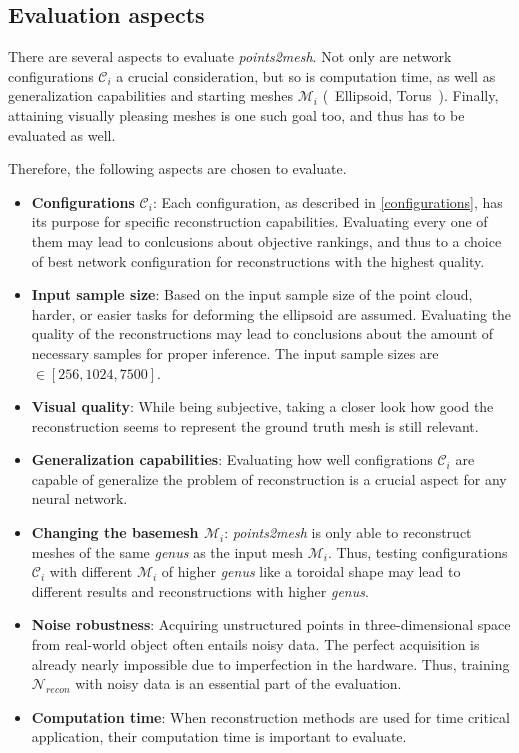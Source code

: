 \subsection{Evaluation aspects}
    There are several aspects to evaluate \emph{points2mesh}. Not only are network configurations $\mathcal{C}_i$ a crucial consideration,
    but so is computation time, as well as generalization capabilities and starting meshes $\mathcal{M}_i$ (~Ellipsoid, Torus~). 
    Finally,
    attaining visually pleasing meshes is one such goal too, and thus has to be evaluated as well.

    Therefore, the following aspects are chosen to evaluate.
    \begin{itemize}
        \item \textbf{Configurations} $\mathcal{C}_i$: Each configuration, as described in \ref{configurations}, has its purpose 
                for specific reconstruction capabilities. Evaluating every one of them may lead to conlcusions about objective rankings, and thus
                to a choice of best network configuration for reconstructions with the highest quality.
        \item \textbf{Input sample size}: Based on the input sample size of the point cloud, harder, or easier tasks for deforming the ellipsoid are assumed. 
                Evaluating the quality of the reconstructions may lead to conclusions about the amount of necessary samples for proper inference.
                The input sample sizes are $\in[256,1024,7500]$. 
        \item \textbf{Visual quality}: While being subjective, taking a closer look how good the reconstruction seems to represent the ground truth mesh
        is still relevant.
        \item \textbf{Generalization capabilities}: Evaluating how well configrations $\mathcal{C}_i$ are capable of generalize the problem of reconstruction is a crucial aspect
        for any neural network. 
        \item \textbf{Changing the basemesh $\mathcal{M}_i$}: \emph{points2mesh} is only able to reconstruct meshes of the same \emph{genus} as the input mesh $\mathcal{M}_i$.
        Thus, testing configurations $\mathcal{C}_i$ with different $\mathcal{M}_i$ of higher \emph{genus} like a toroidal shape may lead to different results and 
        reconstructions with higher \emph{genus}.
        \item \textbf{Noise robustness}: Acquiring unstructured points in three-dimensional space from real-world object often entails noisy data.
         The perfect acquisition is already nearly impossible due to imperfection in the hardware. Thus, training $\mathcal{N}_{recon}$ with noisy data 
         is an essential part of the evaluation.
        \item \textbf{Computation time}: When reconstruction methods are used for time critical application, their computation time is important to evaluate.
    \end{itemize}

